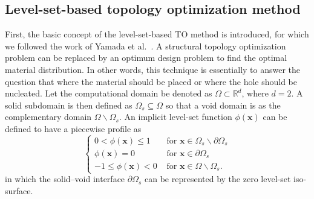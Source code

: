 \subsection{Level-set-based topology optimization method}\label{Section: level-set-based topology optimization method}
First, the basic concept of the level-set-based TO method is introduced, for which we followed the work of Yamada et al.\ \cite{yamada2010topology}. A structural topology optimization problem can be replaced by an optimum design problem to find the optimal material distribution. In other words, this technique is essentially to answer the question that where the material should be placed or where the hole should be nucleated. Let the computational domain be denoted as $\Omega \subset \mathbb{R}^d$, where $d=2$. A solid subdomain is then defined as $\Omega_{s} \subseteq \Omega$ so that a void domain is  as the complementary domain $\Omega \backslash \Omega_{s}$. An implicit level-set function $\phi \left(\boldsymbol{x}\right)$ can be defined to have a piecewise profile as
\begin{equation}
	\left\{\begin{array}{ll}
		{0<\phi(\boldsymbol{x}) \leq 1} & {\text { for } \boldsymbol{x} \in \Omega_{s} \backslash \partial \Omega_{s}} \\
		{\phi(\boldsymbol{x})=0} & {\text { for } \boldsymbol{x} \in \partial \Omega_{s}} \\
		{-1 \leq \phi(\boldsymbol{x})<0} & {\text { for } \boldsymbol{x} \in \Omega \backslash \Omega_{s}}.
	\end{array}\right.
\end{equation}
in which the solid--void interface $\partial \Omega_{s}$ can be represented by the zero level-set iso-surface.  

